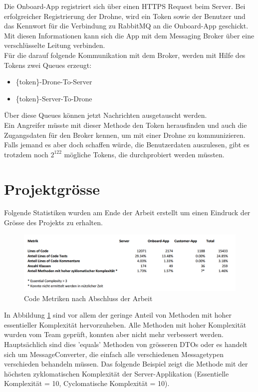 Die Onboard-App registriert sich über einen HTTPS Request beim Server. Bei erfolgreicher Registrierung der Drohne, wird ein Token sowie der Benutzer und das Kennwort für die Verbindung zu RabbitMQ an die Onboard-App geschickt. Mit diesen Informationen kann sich die App mit dem Messaging Broker über eine verschlüsselte Leitung verbinden.\\

Für die darauf folgende Kommunikation mit dem Broker, werden mit Hilfe des Tokens zwei Queues erzeugt: 
\begin{itemize}
	\item \{token\}-Drone-To-Server
	\item  \{token\}-Server-To-Drone
\end{itemize}

Über diese Queues können jetzt Nachrichten ausgetauscht werden. \\

Ein Angreifer müsste mit dieser Methode den Token herausfinden und auch die Zugangsdaten für den Broker kennen, um mit einer Drohne zu kommunizieren. Falls jemand es aber doch schaffen würde, die Benutzerdaten auszulesen, gibt es trotzdem noch $2^{122}$ mögliche Tokens, die durchprobiert werden müssten. \\

\section{Projektgrösse}

Folgende Statistiken wurden am Ende der Arbeit erstellt um einen Eindruck der Grösse des Projekts zu erhalten.\\

\begin{figure}[H]
	\centering
	\includegraphics[width=1.0\textwidth] {images/code-metrics.png}
	\caption{Code Metriken nach Abschluss der Arbeit}
	\label{fig:code-metrics}
\end{figure}

In Abbildung \ref{fig:code-metrics} sind vor allem der geringe Anteil von Methoden mit hoher essentieller Komplexität\cite[S. 79]{MCCABE} hervorzuheben. Alle Methoden mit hoher Komplexität wurden vom Team geprüft, konnten aber nicht mehr verbessert werden. Hauptsächlich sind dies 'equals' Methoden von grösseren DTOs oder es handelt sich um MessageConverter, die einfach alle verschiedenen Messagetypen verschieden behandeln müssen. Das folgende Beispiel zeigt die Methode mit der höchsten zyklomatischen Komplexität der Server-Applikation (Essentielle Komplexität = 10, Cyclomatische Komplexität = 10). \\


